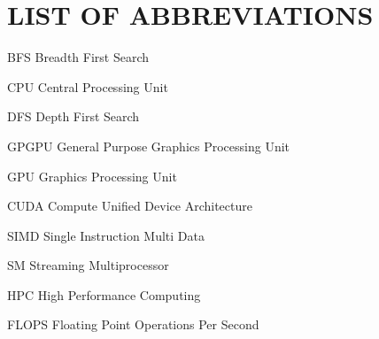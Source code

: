 \documentclass[draftthesis,tocnosub,noragright,centerchapter,12pt]{uiucecethesis09}
\begin{document}
\chapter{LIST OF ABBREVIATIONS}
\begin{symbollist*}
    \item[BFS] Breadth First Search
    \item[CPU] Central Processing Unit
    \item[DFS] Depth First Search
    \item[GPGPU] General Purpose Graphics Processing Unit
    \item[GPU] Graphics Processing Unit
    \item[CUDA] Compute Unified Device Architecture
    \item[SIMD] Single Instruction Multi Data
    \item[SM] Streaming Multiprocessor
    \item[HPC] High Performance Computing
    \item[FLOPS] Floating Point Operations Per Second
\end{symbollist*}


% 
%

\mainmatter

%









%
\appendix


\backmatter

%




\end{document}
